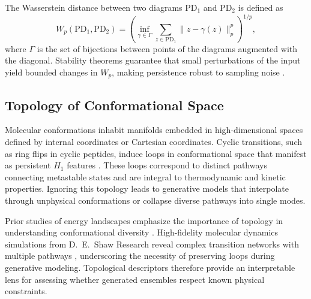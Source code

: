 \documentclass[11pt]{article}
\begin{document}
The Wasserstein distance between two diagrams $\mathrm{PD}_1$ and $\mathrm{PD}_2$ is defined as
\begin{equation}
    W_p(\mathrm{PD}_1, \mathrm{PD}_2) = \left( \inf_{\gamma \in \Gamma} \sum_{z \in \mathrm{PD}_1} \| z - \gamma(z) \|_p^p \right)^{1/p},
    \label{eq:wasserstein}
\end{equation}
where $\Gamma$ is the set of bijections between points of the diagrams augmented with the diagonal. Stability theorems guarantee that small perturbations of the input yield bounded changes in $W_p$, making persistence robust to sampling noise \cite{cohen2007stability, chazal2016structure}.

\subsection{Topology of Conformational Space}
Molecular conformations inhabit manifolds embedded in high-dimensional spaces defined by internal coordinates or Cartesian coordinates. Cyclic transitions, such as ring flips in cyclic peptides, induce loops in conformational space that manifest as persistent $H_1$ features \cite{wales2001microscopic, shaw2010atomic}. These loops correspond to distinct pathways connecting metastable states and are integral to thermodynamic and kinetic properties. Ignoring this topology leads to generative models that interpolate through unphysical conformations or collapse diverse pathways into single modes.

Prior studies of energy landscapes emphasize the importance of topology in understanding conformational diversity \cite{wales2001microscopic}. High-fidelity molecular dynamics simulations from D.~E.~Shaw Research reveal complex transition networks with multiple pathways \cite{shaw2010atomic}, underscoring the necessity of preserving loops during generative modeling. Topological descriptors therefore provide an interpretable lens for assessing whether generated ensembles respect known physical constraints.
\end{document}
